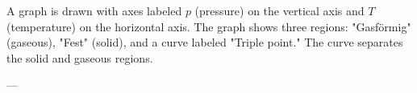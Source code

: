 A graph is drawn with axes labeled \( p \) (pressure) on the vertical axis and \( T \) (temperature) on the horizontal axis. The graph shows three regions: "Gasförmig" (gaseous), "Fest" (solid), and a curve labeled "Triple point." The curve separates the solid and gaseous regions.  

---